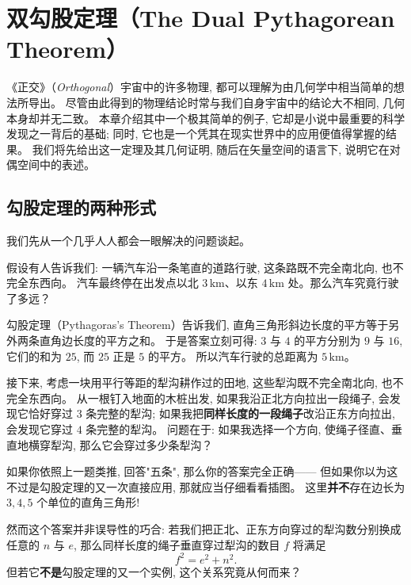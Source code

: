 \chapter{双勾股定理（The Dual Pythagorean Theorem）}

《正交》（\emph{Orthogonal}）宇宙中的许多物理, 都可以理解为由几何学中相当简单的想法所导出。
尽管由此得到的物理结论时常与我们自身宇宙中的结论大不相同, 几何本身却并无二致。
本章介绍其中一个极其简单的例子, 它却是小说中最重要的科学发现之一背后的基础;
同时, 它也是一个凭其在现实世界中的应用便值得掌握的结果。
我们将先给出这一定理及其几何证明, 随后在矢量空间的语言下, 说明它在对偶空间中的表述。

\section{勾股定理的两种形式}

我们先从一个几乎人人都会一眼解决的问题谈起。


假设有人告诉我们: 一辆汽车沿一条笔直的道路行驶, 这条路既不完全南北向, 也不完全东西向。
汽车最终停在出发点以北 $3\,\mathrm{km}$、以东 $4\,\mathrm{km}$ 处。那么汽车究竟行驶了多远？

勾股定理（Pythagoras's Theorem）告诉我们, 直角三角形斜边长度的平方等于另外两条直角边长度的平方之和。
于是答案立刻可得: $3$ 与 $4$ 的平方分别为 $9$ 与 $16$, 它们的和为 $25$, 而 $25$ 正是 $5$ 的平方。
所以汽车行驶的总距离为 $5\,\mathrm{km}$。


接下来, 考虑一块用平行等距的犁沟耕作过的田地, 这些犁沟既不完全南北向, 也不完全东西向。
从一根钉入地面的木桩出发, 如果我沿正北方向拉出一段绳子, 会发现它恰好穿过 $3$ 条完整的犁沟;
如果我把\textbf{同样长度的一段绳子}改沿正东方向拉出, 会发现它穿过 $4$ 条完整的犁沟。
问题在于: 如果我选择一个方向, 使绳子径直、垂直地横穿犁沟, 那么它会穿过多少条犁沟？

如果你依照上一题类推, 回答"五条", 那么你的答案完全正确——
但如果你以为这不过是勾股定理的又一次直接应用, 那就应当仔细看看插图。
这里\textbf{并不}存在边长为 $3,4,5$ 个单位的直角三角形!

然而这个答案并非误导性的巧合: 若我们把正北、正东方向穿过的犁沟数分别换成任意的 $n$ 与 $e$,
那么同样长度的绳子垂直穿过犁沟的数目 $f$ 将满足
\begin{equation}
f^{2} = e^{2} + n^{2}.
\end{equation}
但若它\textbf{不是}勾股定理的又一个实例, 这个关系究竟从何而来？

